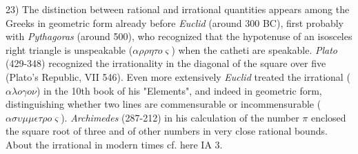 \vfill
\leftline{\rule{2in}{0.4pt}}
\vspace{0.2cm}
{
\footnotesize
23) The distinction between rational and irrational quantities appears among the Greeks in geometric form already before \textit{Euclid} (around 300 BC), first probably with \textit{Pythagoras} (around 500), who recognized that the hypotenuse of an isosceles right triangle is unspeakable ($\alpha\rho\rho\eta\tau o\varsigma$) when the catheti are speakable. \textit{Plato} (429-348) recognized the irrationality in the diagonal of the square over five (Plato's Republic, VII 546). Even more extensively \textit{Euclid} treated the irrational ($\alpha\lambda o\gamma o\nu$) in the 10th book of his "Elements", and indeed in geometric form, distinguishing whether two lines are commensurable or incommensurable ($\alpha\sigma\upsilon\mu\mu\epsilon\tau\rho o\varsigma$). \textit{Archimedes} (287-212) in his calculation of the number $\pi$ enclosed the square root of three and of other numbers in very close rational bounds. About the irrational in modern times cf. here IA 3.

}
